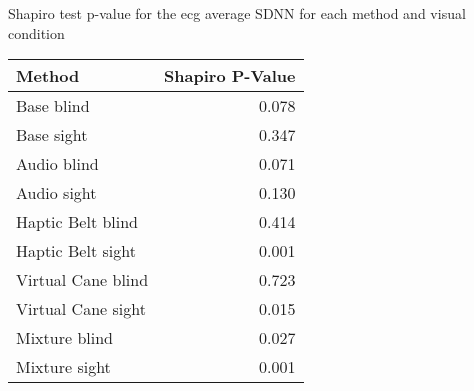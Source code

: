 
\centering
\caption{Shapiro test p-value for the ecg average SDNN for each method and visual condition}
\label{tab:shapiro_ecg_sdnn}
\begin{tabular}{lr}
\toprule
            Method &  Shapiro P-Value \\
\midrule
        Base blind &            0.078 \\
        Base sight &            0.347 \\
       Audio blind &            0.071 \\
       Audio sight &            0.130 \\
 Haptic Belt blind &            0.414 \\
 Haptic Belt sight &            0.001 \\
Virtual Cane blind &            0.723 \\
Virtual Cane sight &            0.015 \\
     Mixture blind &            0.027 \\
     Mixture sight &            0.001 \\
\bottomrule
\end{tabular}
